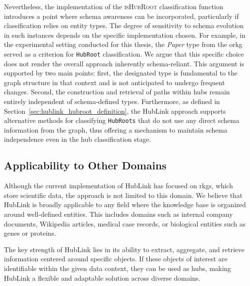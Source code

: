 Nevertheless, the implementation of the \textsc{isHubRoot} classification function introduces a point where schema awareness can be incorporated, particularly if classification relies on entity types. The degree of sensitivity to schema evolution in such instances depends on the specific implementation chosen. For example, in the experimental setting conducted for this thesis, the \emph{Paper} type from the \gls{orkg} served as a criterion for \texttt{HubRoot} classification. We argue that this specific choice does not render the overall approach inherently schema-reliant. This argument is supported by two main points: first, the designated type is fundamental to the graph structure in that context and is not anticipated to undergo frequent changes. Second, the construction and retrieval of paths within hubs remain entirely independent of schema-defined types. Furthermore, as defined in Section~\ref{sec:hublink_hubroot_definition}, the HubLink approach supports alternative methods for classifying \texttt{HubRoots} that do not use any direct schema information from the graph, thus offering a mechanism to maintain schema independence even in the hub classification stage.



\subsection{Applicability to Other Domains}

Although the current implementation of HubLink has focused on \glspl{rkg}, which store scientific data, the approach is not limited to this domain. We believe that HubLink is broadly applicable to any field where the knowledge base is organized around well-defined entities. This includes domains such as internal company documents, Wikipedia articles, medical case records, or biological entities such as genes or proteins.

The key strength of HubLink lies in its ability to extract, aggregate, and retrieve information centered around specific objects. If these objects of interest are identifiable within the given data context, they can be used as hubs, making HubLink a flexible and adaptable solution across diverse domains. 

